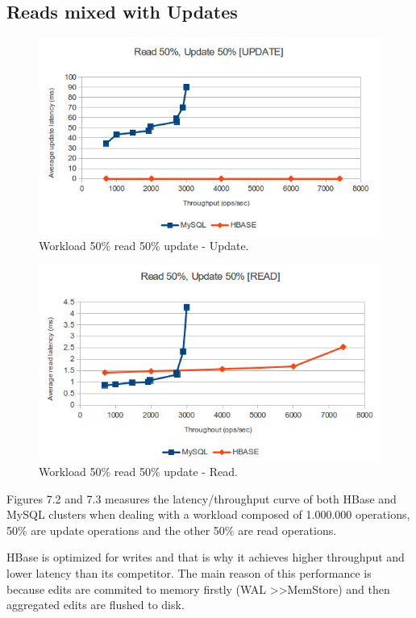 \subsection{Reads mixed with Updates}


\begin{figure}[htb]
\centering
\includegraphics[width=1\textwidth]{./images/workloadAUpdate1.png}
\caption{Workload 50\% read 50\% update - Update.}
\label{fig:AUpdate}
\end{figure}

\begin{figure}[htb]
\centering
\includegraphics[width=1\textwidth]{./images/workloadARead1.png}
\caption{Workload 50\% read 50\% update - Read.}
 \label{fig:ARead}
\end{figure}

Figures 7.2 and 7.3 measures the latency/throughput curve of both HBase and MySQL clusters when dealing with a workload composed of 1.000.000 operations, 50\% are update operations and the other 50\% are read operations.
\par
HBase is optimized for writes and that is why it achieves higher throughput and lower latency than its competitor. The main reason of this performance is because edits are commited to memory firstly (WAL \textgreater\textgreater MemStore) and then aggregated edits are flushed to disk.


